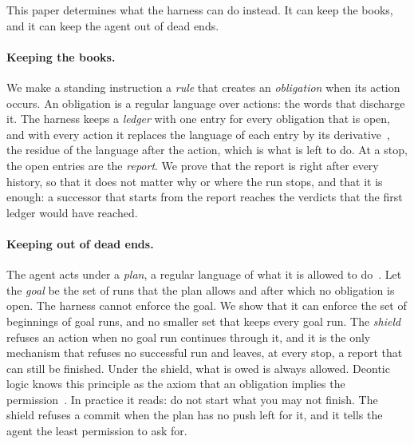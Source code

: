 \documentclass[acmsmall,nonacm,screen]{acmart}
\begin{document}
This paper determines what the harness can do instead. It can keep the books, and it can
keep the agent out of dead ends.

\paragraph{Keeping the books.} We make a standing instruction a \emph{rule} that creates an
\emph{obligation} when its action occurs. An obligation is a regular language over actions:
the words that discharge it. The harness keeps a \emph{ledger} with one entry for every
obligation that is open, and with every action it replaces the language of each entry by its
derivative~\cite{brzozowski1964}, the residue of the language after the action, which is what
is left to do. At a stop, the open entries
are the \emph{report}. We prove that the report is right after every history, so that it
does not matter why or where the run stops, and that it is enough: a successor that starts
from the report reaches the verdicts that the first ledger would have reached.

\paragraph{Keeping out of dead ends.} The agent acts under a \emph{plan}, a regular language
of what it is allowed to do~\cite{tpp11}. Let the \emph{goal} be the set of runs that the
plan allows and after which no obligation is open. The harness cannot enforce the goal. We
show that it can enforce the set of beginnings of goal runs, and no smaller set that keeps
every goal run. The \emph{shield} refuses an
action when no goal run continues through it, and it is the only mechanism that refuses no
successful run and leaves, at every stop, a report that can still be finished. Under the
shield, what is owed is always allowed. Deontic logic knows this principle as the axiom that
an obligation implies the permission~\cite{vonwright1951}. In practice it reads: do not
start what you may not finish. The shield refuses a commit when the plan has no push left
for it, and it tells the agent the least permission to ask for.
\end{document}
